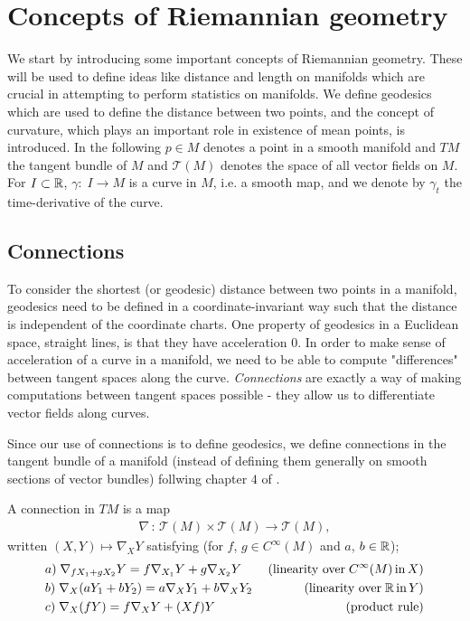 \section{Concepts of Riemannian geometry}
\label{sec:concepts_of_Riemannian_geometry}

We start by introducing some important concepts of Riemannian geometry. These will be used to define ideas like distance and length on manifolds which are crucial in attempting to perform statistics on manifolds. We define geodesics which are used to define the distance between two points, and the concept of curvature, which plays an important role in existence of mean points, is introduced. In the following $p \in M$ denotes a point in a smooth manifold and $TM$ the tangent bundle of $M$ and $\mathcal{T}(M)$ denotes the space of all vector fields on $M$. For $I \subset \mathbb{R}$, $\gamma: \; I \rightarrow M$ is a curve in $M$, i.e. a smooth map, and we denote by $\gamma_t$ the time-derivative of the curve.    

\subsection{Connections}

To consider the shortest (or geodesic) distance between two points in a manifold, geodesics need to be defined in a coordinate-invariant way such that the distance is independent of the coordinate charts. One property of geodesics in a Euclidean space, straight lines, is that they have acceleration $0$. In order to make sense of acceleration of a curve in a manifold, we need to be able to compute "differences" between tangent spaces along the curve. \textit{Connections} are exactly a way of making computations between tangent spaces possible - they allow us to differentiate vector fields along curves.

Since our use of connections is to define geodesics, we define connections in the tangent bundle of a manifold (instead of defining them generally on smooth sections of vector bundles) follwing chapter $4$ of \cite{lee2006riemannian}. 

\begin{definition}
A connection in $TM$ is a map
\begin{align*}
\nabla \, : \, \mathcal{T}(M) \times \mathcal{T}(M) \rightarrow \mathcal{T}(M),
\end{align*}
written $(X, Y) \mapsto \nabla_X Y$ satisfying (for $f$, $g \in C^\infty(M)$ and $a$, $b \in \mathbb{R}$);
\begin{align*}
& a) \; \nabla_{fX_1 + gX_2} Y = f\nabla_{X_1} Y + g\nabla_{X_2} Y \; \; \; \; & \text{(linearity over} \; C^\infty(M) \, \text{in} \, X) \\
& b) \; \nabla_X (aY_1 + bY_2) = a\nabla_X Y_1 + b\nabla_X Y_2 & \text{(linearity over} \; \mathbb{R} \, \text{in} \, Y) \\
& c) \; \nabla_X (fY) = f\nabla_X Y + (Xf)Y & \text{(product rule)}
\end{align*}
\end{definition}

